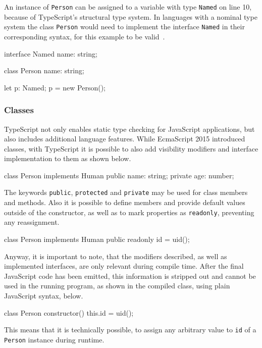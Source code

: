 \begin{program}
\caption{An instance of \texttt{Person} can be assigned to a variable with type \texttt{Named} on line 10, because of TypeScript's structural type system. In languages with a nominal type system the class \texttt{Person} would need to implement the interface \texttt{Named} in their corresponding syntax, for this example to be valid~\cite{TypeScriptHandbook:TypeCompatibility}.}
\label{prog:structural-typing}
\begin{JsCode}
interface Named {
    name: string;
}

class Person {
    name: string;
}

let p: Named;
p = new Person();
\end{JsCode}
\end{program}

\subsubsection{Classes}
\label{sec:ts-classes}

TypeScript not only enables static type checking for JavaScript applications, but also includes additional language features. While EcmaScript 2015 introduced classes, with TypeScript it is possible to also add visibility modifiers and interface implementation to them as shown below.
\begin{JsCode}[numbers=none]
class Person implements Human {
  public name: string;
  private age: number;
}
\end{JsCode}
The keywords \texttt{public}, \texttt{protected} and \texttt{private} may be used for class members and methods.
Also it is possible to define members and provide default values outside of the constructor, as well as to mark properties as \texttt{readonly}, preventing any reassignment.
\begin{JsCode}[numbers=none]
class Person implements Human {
  public readonly id = uid();
}
\end{JsCode}
Anyway, it is important to note, that the modifiers described, as well as implemented interfaces, are only relevant during compile time. After the final JavaScript code has been emitted, this information is stripped out and cannot be used in the running program, as shown in the compiled class, using plain JavaScript syntax, below.
\begin{JsCode}[numbers=none]
class Person {
  constructor() {
    this.id = uid();
  }
}
\end{JsCode}
This means that it is technically possible, to assign any arbitrary value to \texttt{id} of a \texttt{Person} instance during runtime.

